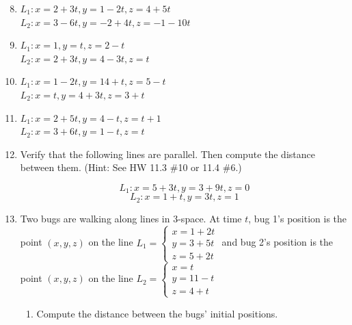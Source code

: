 \documentclass[12pt]{article}
\newif\ifans
\begin{document}
\begin{enumerate}
\setcounter{enumi}{7}

\item $L_1: x=2+3t, y=1-2t, z=4+5t$\\
$L_2: x=3-6t, y=-2+4t, z=-1-10t$

\ifans{\fbox{The lines are parallel.}} \fi

\item $L_1: x=1, y=t, z=2-t$\\
$L_2: x=2+3t, y=4-3t, z=t$

\ifans{\fbox{The lines are skew.}} \fi

\item $L_1: x=1-2t, y=14+t, z=5-t$\\
$L_2: x=t, y=4+3t, z=3+t$

\ifans{\fbox{The lines intersect at the point $(x,y,z)=(3,13,6)$}} \fi

\item $L_1: x=2+5t, y=4-t, z=t+1$\\
$L_2: x=3+6t, y=1-t, z=t$

\ifans{\fbox{The lines are skew.}} \fi

\item Verify that the following lines are parallel.  Then compute the distance between them. (Hint: See HW 11.3 \#10 or 11.4 \#6.)

$$L_1: x=5+3t, y=3+9t, z=0$$
$$L_2: x=1+t, y=3t, z=1$$

\ifans{\fbox{\parbox{1\linewidth}{The lines are parallel because $\langle 3,9,0\rangle=3\langle1,3,0\rangle$.  The distance between the lines is $d=\sqrt{\frac{91}{10}}$}}} \fi

\item Two bugs are walking along lines in 3-space.  At time $t$, bug 1's position is the point $(x,y,z)$ on the line $L_1=\left\{\begin{array}{l}
x=1+2t\\
y=3+5t\\
z=5+2t\end{array}\right.$ and bug 2's position is the point $(x,y,z)$ on the line $L_2=\left\{\begin{array}{l}
x=t\\
y=11-t\\
z=4+t\end{array}\right.$

\begin{enumerate}

\item Compute the distance between the bugs' initial positions.


\end{enumerate}
\end{enumerate}
\end{document}
